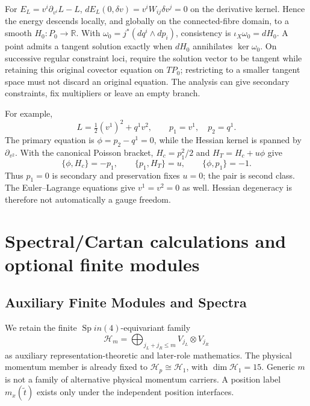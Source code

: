 \documentclass[11pt,a4paper]{article}
\begin{document}
For \(E_L=v^i\partial_{v^i}L-L\),
\(dE_L(0,\delta v)=v^iW_{ij}\delta v^j=0\) on the derivative kernel.
Hence the energy descends locally, and globally on the connected-fibre
domain, to a smooth \(H_0:P_0\to\mathbb R\). With
\(\omega_0=j^*(dq^i\wedge dp_i)\), consistency is
\(\iota_X\omega_0=dH_0\). A point admits a tangent solution exactly
when \(dH_0\) annihilates \(\ker\omega_0\). On successive regular
constraint loci, require the solution vector to be tangent while retaining
this original covector equation on \(T P_0\); restricting to a smaller
tangent space must not discard an original equation. The analysis can give
secondary constraints, fix multipliers or leave an empty branch.

For example,
\[
 L=\tfrac12(v^1)^2+q^1v^2,
 \qquad p_1=v^1,\quad p_2=q^1.
\]
The primary equation is \(\phi=p_2-q^1=0\), while the Hessian kernel
is spanned by \(\partial_{v^2}\). With the canonical Poisson bracket,
\(H_c=p_1^2/2\) and \(H_T=H_c+u\phi\) give
\[
 \{\phi,H_c\}=-p_1,\qquad \{p_1,H_T\}=u,
 \qquad \{\phi,p_1\}=-1.
\]
Thus \(p_1=0\) is secondary and preservation fixes \(u=0\); the pair
is second class. The Euler--Lagrange equations give \(v^1=v^2=0\) as
well. Hessian degeneracy is therefore not automatically a gauge freedom.

\begingroup
\small
\RaggedRight
\setlength{\emergencystretch}{3em}

\endgroup


\section{Spectral/Cartan calculations and optional finite modules}
\label{p3g:sec:spectral}
\subsection{Auxiliary Finite Modules and Spectra}
\label{p3:sec:s3m}

We retain the finite \(\operatorname{Sp}in(4)\)-equivariant family
\[
\mathcal H_m=\bigoplus_{j_L+j_R\le m}V_{j_L}\otimes V_{j_R}
\]
as auxiliary representation-theoretic and later-role mathematics.  The
physical momentum member is already fixed to \(\mathcal H_p\cong\mathcal H_1\),
with \(\dim\mathcal H_1=15\).  Generic \(m\) is not a family of alternative
physical momentum carriers.  A position label \(m_x(\widetilde t)\) exists
only under the independent position interfaces.
\end{document}
